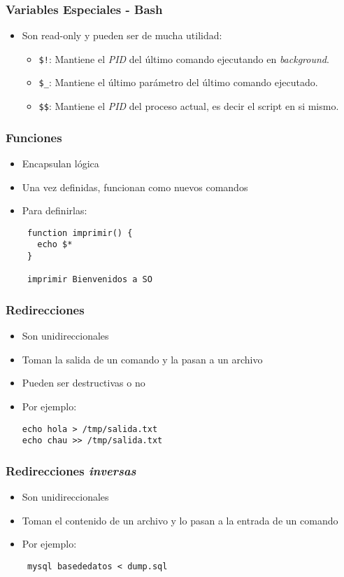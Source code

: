 \begin{frame}
  \frametitle{Variables Especiales - \textbf{Bash}}
  \begin{itemize}
    \item Son read-only y pueden ser de mucha utilidad:
    \begin{itemize}
      \item \texttt{\$!}: Mantiene el \textit{PID} del último comando ejecutando en \textit{background}.
      \item \texttt{\$\_}: Mantiene el último parámetro del último comando ejecutado.
      \item \texttt{\$\$}: Mantiene el \textit{PID} del proceso actual, es decir el script en si mismo.
    \end{itemize}
  \end{itemize}
\end{frame}

\begin{frame}[fragile]
  \frametitle{Funciones}
  \begin{itemize}
    \item Encapsulan lógica
    \item Una vez definidas, funcionan como nuevos comandos
    \item Para definirlas:
   \begin{lstlisting}
 function imprimir() {
   echo $*
 }

 imprimir Bienvenidos a SO
   \end{lstlisting}
  \end{itemize}
\end{frame}

\begin{frame}[fragile]
  \frametitle{Redirecciones}
  \begin{itemize}
    \item Son unidireccionales
    \item Toman la salida de un comando y la pasan a un archivo
    \item Pueden ser destructivas o no
    \item Por ejemplo:
   \begin{lstlisting}
echo hola > /tmp/salida.txt
echo chau >> /tmp/salida.txt
   \end{lstlisting}
  \end{itemize}
\end{frame}

\begin{frame}[fragile]
  \frametitle{Redirecciones \textit{inversas}}
  \begin{itemize}
    \item Son unidireccionales
    \item Toman el contenido de un archivo y lo pasan a la entrada de un comando
    \item Por ejemplo:
   \begin{lstlisting}
 mysql basededatos < dump.sql
   \end{lstlisting}
  \end{itemize}
\end{frame}


